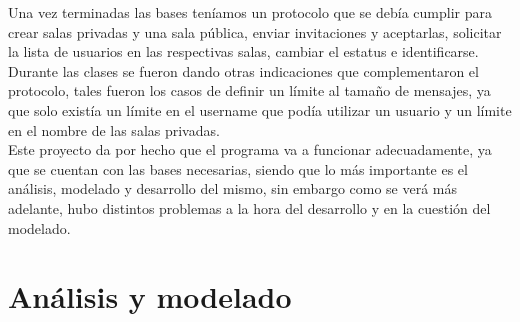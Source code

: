 \documentclass[12pt,a4paper]{article}
\begin{document}
Una vez terminadas las bases teníamos un protocolo que se debía cumplir para crear salas privadas y una sala pública, enviar invitaciones 
y aceptarlas, solicitar la lista de usuarios en las respectivas salas, cambiar el estatus e identificarse. Durante las clases se fueron 
dando otras indicaciones que complementaron el protocolo, tales fueron los casos de definir un límite al tamaño de mensajes, ya que solo 
existía un límite en el username que podía utilizar un usuario y un límite en el nombre de las salas privadas.
\\
Este proyecto da por hecho que el programa va a funcionar adecuadamente, ya que se cuentan con las bases necesarias, siendo que lo más 
importante es el análisis, modelado y desarrollo del mismo, sin embargo como se verá más adelante, hubo distintos problemas a la hora del 
desarrollo y en la cuestión del modelado.

\section{Análisis y modelado}
\end{document}
